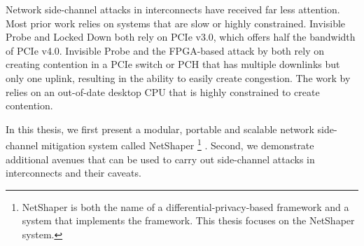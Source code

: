Network side-channel attacks in interconnects have received far less attention.
Most prior work relies on systems that are slow or highly constrained.
Invisible Probe \cite{tan2021invisible} and Locked Down \cite{side2022lockeddown} both rely on PCIe v3.0, which offers half the bandwidth of PCIe v4.0.
Invisible Probe \cite{tan2021invisible} and the FPGA-based attack by \citet{giechaskiel2022cross} both rely on creating contention in a PCIe switch or PCH that has multiple downlinks but only one uplink, resulting in the ability to easily create congestion.
The work by \citet{khaliq2021timing} relies on an out-of-date desktop CPU that is highly constrained to create contention.

In this thesis, we first present a modular, portable and scalable network side-channel mitigation system called NetShaper 
\footnote{NetShaper is both the name of a differential-privacy-based framework and a system that implements the framework. This thesis focuses on the NetShaper system.} \cite{sabzi2024netshaper}.
Second, we demonstrate additional avenues that can be used to carry out side-channel attacks in interconnects and their caveats.


\begin{comment}


End-host modification (not scalable):
\cite{cai2014csbuflo, cherubin2017llama, luo2011httpos, smith2022qcsd, wang2017walkie}

Relies on only simulation or do not have any deployable implementation:
\cite{abusnaina2020dfd, beckerle2022splitting, cai2014tamaraw, gong2022surakav, hou2020wf, juarez2016wtfpad, nasr2021blind, rahman2020mockingbird, shan2021dolos, wang2014supersequence, wright2009morphing}

Not-adaptive to application requirements:
\cite{barradas2017deltashaper}

Not application agnostic:
\cite{cherubin2017llama, luo2011httpos}

Hard to deploy:
\cite{beckerle2022splitting, de2020trafficsliver}

\end{comment}